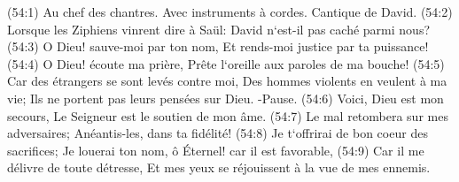 \verse (54:1) Au chef des chantres. Avec instruments à cordes. Cantique de David. (54:2) Lorsque les Ziphiens vinrent dire à Saül: David n`est-il pas caché parmi nous? (54:3) O Dieu! sauve-moi par ton nom, Et rends-moi justice par ta puissance! 
\verse (54:4) O Dieu! écoute ma prière, Prête l`oreille aux paroles de ma bouche! 
\verse (54:5) Car des étrangers se sont levés contre moi, Des hommes violents en veulent à ma vie; Ils ne portent pas leurs pensées sur Dieu. -Pause. 
\verse (54:6) Voici, Dieu est mon secours, Le Seigneur est le soutien de mon âme. 
\verse (54:7) Le mal retombera sur mes adversaires; Anéantis-les, dans ta fidélité! 
\verse (54:8) Je t`offrirai de bon coeur des sacrifices; Je louerai ton nom, ô Éternel! car il est favorable, 
\verse (54:9) Car il me délivre de toute détresse, Et mes yeux se réjouissent à la vue de mes ennemis. 

\chapter{}

